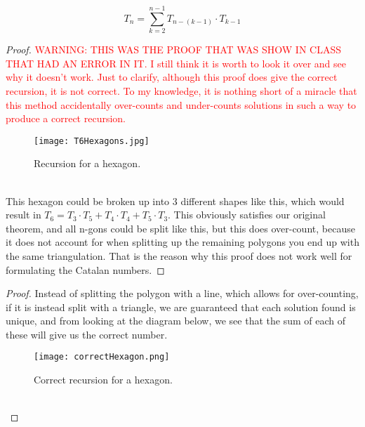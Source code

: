 \documentclass[11pt,twosided]{article}
\begin{document}
\begin{theorem}
	$$T_n = \sum_{k=2}^{n-1}T_{n-(k-1)}\cdot T_{k-1}$$
\end{theorem}
\begin{proof}
	\textcolor{red}{WARNING: THIS WAS THE PROOF THAT WAS SHOW IN CLASS THAT HAD AN ERROR IN IT. I still think it is worth to look it over and see why it doesn't work. Just to clarify, although this proof does give the correct recursion, it is not correct. To my knowledge, it is nothing short of a miracle that this method accidentally over-counts and under-counts solutions in such a way to produce a correct recursion.}
	\begin{figure}[h]
        \texttt{[image: T6Hexagons.jpg]}
        \caption{Recursion for a hexagon.}
        \label{fig:hex1}
    \end{figure}\\
    This hexagon could be broken up into 3 different shapes like this, which would result in $T_6 = T_3\cdot T_5 + T_4\cdot T_4 + T_5\cdot T_3$. This obviously satisfies our original theorem, and all n-gons could be split like this, but this does over-count, because it does not account for when splitting up the remaining polygons you end up with the same triangulation. That is the reason why this proof does not work well for formulating the Catalan numbers.
\end{proof}
\begin{proof}
    Instead of splitting the polygon with a line, which allows for over-counting, if it is instead split with a triangle, we are guaranteed that each solution found is unique, and from looking at the diagram below, we see that the sum of each of these will give us the correct number.
    \begin{figure}[h]
        \texttt{[image: correctHexagon.png]}
        \caption{Correct recursion for a hexagon.}
        \label{fig:hex2}
    \end{figure}\\
\end{proof}
\end{document}
